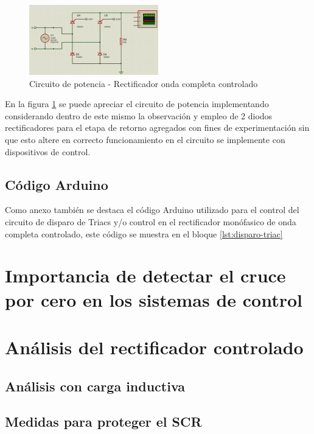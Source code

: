 \documentclass[conference]{IEEEtran}
\begin{document}
	
	\begin{figure}[h]
		\centering
		\includegraphics[width=0.5\textwidth]{media/circuito-potencia}
		\caption{Circuito de potencia - Rectificador onda completa controlado}
		\label{fig:circuito-potencia}
	\end{figure}
	
	En la figura \ref{fig:circuito-potencia} se puede apreciar el circuito de potencia implementando considerando dentro de este mismo la observación y empleo de 2 diodos rectificadores para el etapa de retorno agregados con fines de experimentación sin que esto altere en correcto funcionamiento en el circuito se implemente con dispositivos de control.
	
	\subsection{\textbf{Código Arduino}}
	
	Como anexo también se destaca el código Arduino utilizado para el control del circuito de disparo de Triacs y/o control en el rectificador monófasico de onda completa controlado, este código se muestra en el bloque \ref{lst:disparo-triac}
	
	\section{Importancia de detectar el cruce por cero en los sistemas de control}
	\section{Análisis del rectificador controlado}
	\subsection{Análisis con carga inductiva}
	\subsection{Medidas para proteger el SCR}
	
	
\end{document}
